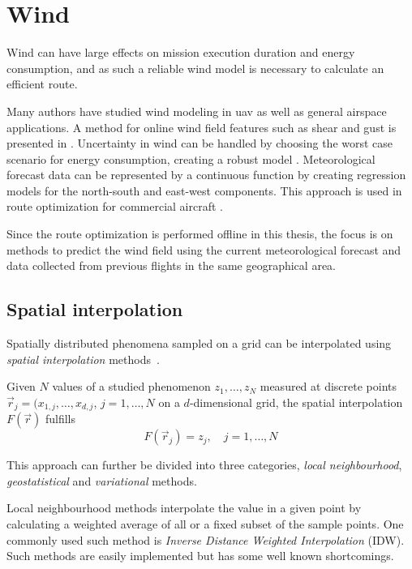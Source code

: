 \section{Wind}\label{sec:wind}
Wind can have large effects on mission execution duration and energy consumption, and as such a reliable wind model is necessary to calculate an efficient route.

Many authors have studied wind modeling in \ac{uav} as well as general airspace applications. A method for online wind field features such as shear and gust is presented in \cite{wind_estimation}. Uncertainty in wind can be handled by choosing the worst case scenario for energy consumption, creating a robust model \cite{wind_blackbox}. Meteorological forecast data can be represented by a continuous function by creating regression models for the north-south and east-west components. This approach is used in route optimization for commercial aircraft \cite{aircraft_trajectory_thesis}.

Since the route optimization is performed offline in this thesis, the focus is on methods to predict the wind field using the current meteorological forecast and data collected from previous flights in the same geographical area.

\subsection{Spatial interpolation}
Spatially distributed phenomena sampled on a grid can be interpolated using \textit{spatial interpolation} methods~\cite{spatial_interpolation}.

\begin{definition}
    Given $N$ values of a studied phenomenon $z_1,\ldots,z_N$ measured at discrete points $\vec{r}_j=(x_{1,j}, \ldots, x_{d,j}$, $j=1,\ldots,N$ on a $d$-dimensional grid, the spatial interpolation $F(\vec{r})$ fulfills
    \begin{equation}
        F(\vec{r}_j)=z_j,\quad j=1,\ldots,N
    \end{equation}
\end{definition}

This approach can further be divided into three categories, \textit{local neighbourhood}, \textit{geostatistical} and \textit{variational} methods.

Local neighbourhood methods interpolate the value in a given point by calculating a weighted average of all or a fixed subset of the sample points. One commonly used such method is \textit{Inverse Distance Weighted Interpolation} (IDW). Such methods are easily implemented but has some well known shortcomings.


